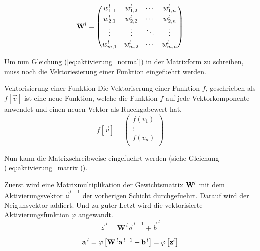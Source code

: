 \documentclass[../main]{subfiles}
\begin{document}
\begin{equation}\label{eq:gewichtsmatrix}
  \mathbf{W}^l =
  \begin{pmatrix}
    w_{1,1}^l & w_{1,2}^l & \cdots & w_{1,n}^l \\[0.3em]
    w_{2,1}^l & w_{2,2}^l & \cdots & w_{2,n}^l \\[0.3em]
    \vdots & \vdots & \ddots & \vdots \\[0.3em]
    w_{m,1}^l & w_{m,2}^l & \cdots & w_{m,n}^l
  \end{pmatrix}
\end{equation}

Um nun Gleichung (\ref{eq:aktivierung_normal}) in der Matrixform zu schreiben,
muss noch die Vektoriesierung einer Funktion eingefuehrt werden.
\par\medskip

\begin{defbox}{Vektorisierung einer Funktion}
  Die Vektoriserung einer Funktion $f$, geschrieben als $f[\vec{v}]$ ist eine neue Funktion, welche die Funktion $f$ auf jede Vektorkomponente anwendet und einen neuen Vektor als Rueckgabewert hat.
  \begin{equation*}
    f[\vec{v}]=
    \begin{pmatrix}
      f(v_1)\\
      \vdots \\
      f(v_n)\\
    \end{pmatrix}
  \end{equation*}
\end{defbox}

\par\medskip

Nun kann die Matrixschreibweise eingefuehrt werden (siehe Gleichung (\ref{eq:aktivierung_matrix})).\par
Zuerst wird eine Matrixmultiplikation der Gewichtsmatrix $\mathbf{W}^l$ mit dem
Aktivierungsvektor $\vec{a}^{l-1}$ der vorherigen Schicht durchgefuehrt. Darauf
wird der Neigunsvektor addiert. Und zu guter Letzt wird die vektorisierte
Aktivierungsfunktion $\varphi$ angewandt.
\begin{equation}\label{eq:aktivierung_matrix}
  \vec{z}^{\,l} = \mathbf{W}^{\,l} \vec{a}^{\,l-1} + \vec{b}^{\,l}
\end{equation}
\par
\begin{equation}\label{eq:aktivierung_matrix}
  \mathbf{a}^{\,l} = \varphi \left[\mathbf{W}^{\,l} \mathbf{a}^{\,l-1} + \mathbf{b}^{\,l} \right] = \varphi \left[ \mathbf{z}^l \right]
\end{equation}
\end{document}

